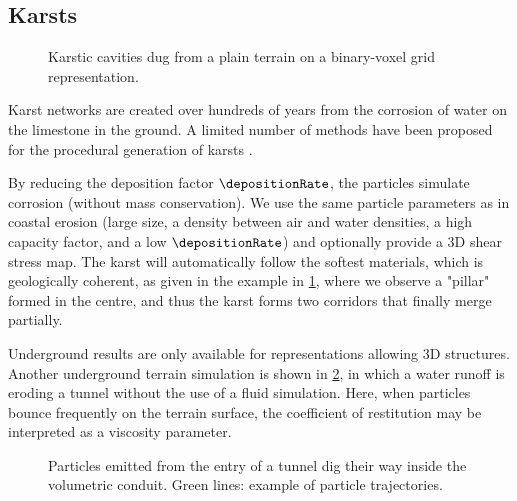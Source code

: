\subsection{Karsts} 

\begin{figure}[H]
    \caption[Karstic cavity simulation]{Karstic cavities dug from a plain terrain on a binary-voxel grid representation.}
    \label{fig:erosion-results-karst}
\end{figure}

Karst networks are created over hundreds of years from the corrosion of water on the limestone in the ground. A limited number of methods have been proposed for the procedural generation of karsts \cite{Paris2021}.

By reducing the deposition factor $\depositionRate$, the particles simulate corrosion (without mass conservation). We use the same particle parameters as in coastal erosion (large size, a density between air and water densities, a high capacity factor, and a low $\depositionRate$) and optionally provide a 3D shear stress map. The karst will automatically follow the softest materials, which is geologically coherent, as given in the example in \cref{fig:erosion-results-karst}, where we observe a "pillar" formed in the centre, and thus the karst forms two corridors that finally merge partially. %

Underground results are only available for representations allowing 3D structures. Another underground terrain simulation is shown in \cref{fig:erosion-results-tunnel}, in which a water runoff is eroding a tunnel without the use of a fluid simulation. Here, when particles bounce frequently on the terrain surface, the coefficient of restitution may be interpreted as a viscosity parameter. %


\begin{figure}[H]
    \caption[Tunnel digging simulation]{Particles emitted from the entry of a tunnel dig their way inside the volumetric conduit. Green lines: example of particle trajectories. }
    \label{fig:erosion-results-tunnel}
\end{figure}

